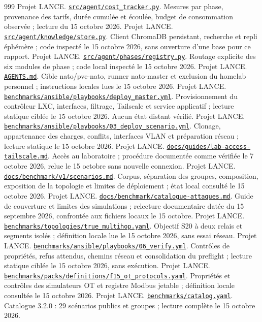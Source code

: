 \documentclass[11pt,a4paper]{article}
\newcommand{\source}[2]{\href{../../#1}{\nolinkurl{#1}}. #2}
\begin{document}
\begin{thebibliography}{999}
 Projet LANCE. \source{src/agent/cost_tracker.py}{Mesures par phase, provenance des tarifs, durée cumulée et écoulée, budget de consommation observée ; lecture du 15 octobre 2026.}
 Projet LANCE. \source{src/agent/knowledge/store.py}{Client ChromaDB persistant, recherche et repli éphémère ; code inspecté le 15 octobre 2026, sans ouverture d'une base pour ce rapport.}
 Projet LANCE. \source{src/agent/phases/registry.py}{Routage explicite des six modules de phase ; code local inspecté le 15 octobre 2026.}
 Projet LANCE. \source{AGENTS.md}{Cible nato/pve-nato, runner nato-master et exclusion du homelab personnel ; instructions locales lues le 15 octobre 2026.}
 Projet LANCE. \source{benchmarks/ansible/playbooks/deploy_master.yml}{Provisionnement du contrôleur LXC, interfaces, filtrage, Tailscale et service applicatif ; lecture statique ciblée le 15 octobre 2026. Aucun état distant vérifié.}
 Projet LANCE. \source{benchmarks/ansible/playbooks/03_deploy_scenario.yml}{Clonage, appartenance des charges, conflits, interfaces VLAN et préparation réseau ; lecture statique le 15 octobre 2026.}
 Projet LANCE. \source{docs/guides/lab-access-tailscale.md}{Accès au laboratoire ; procédure documentée comme vérifiée le 7 octobre 2026, relue le 15 octobre sans nouvelle connexion.}
 Projet LANCE. \source{docs/benchmark/v1/scenarios.md}{Corpus, séparation des groupes, composition, exposition de la topologie et limites de déploiement ; état local consulté le 15 octobre 2026.}
 Projet LANCE. \source{docs/benchmark/catalogue-attaques.md}{Guide de couverture et limites des simulations ; relecture documentaire datée du 15 septembre 2026, confrontée aux fichiers locaux le 15 octobre.}
 Projet LANCE. \source{benchmarks/topologies/true_multihop.yaml}{Objectif S20 à deux relais et segments isolés ; définition locale lue le 15 octobre 2026, sans essai réseau.}
 Projet LANCE. \source{benchmarks/ansible/playbooks/06_verify.yml}{Contrôles de propriétés, refus attendus, chemins réseau et consolidation du preflight ; lecture statique ciblée le 15 octobre 2026, sans exécution.}
 Projet LANCE. \source{benchmarks/packs/definitions/f15_ot_protocols.yaml}{Propriétés et contrôles des simulateurs OT et registre Modbus jetable ; définition locale consultée le 15 octobre 2026.}
 Projet LANCE. \source{benchmarks/catalog.yaml}{Catalogue 3.2.0 : 29 scénarios publics et groupes ; lecture complète le 15 octobre 2026.}

\end{thebibliography}
\end{document}
